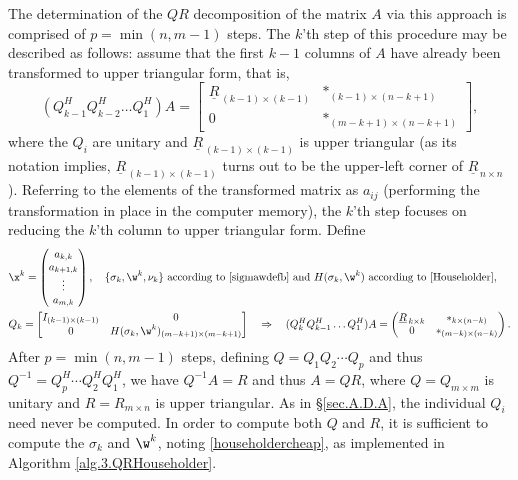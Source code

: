 The determination of the $QR$ decomposition of the matrix $A$ via this
approach is comprised of $p=\min(n,m-1)$ steps.  The $k$'th step of this
procedure may be described as follows: assume that the first $k-1$
columns of $A$ have already been transformed to upper triangular form,
that is,
\begin{equation*}
	 (Q_{k-1}^{H}Q_{k-2}^{H}\hdots Q_{1}^{H})A=\begin{bmatrix} \underline{R}_{\,(k-1)\times (k-1)} & *_{(k-1)\times (n-k+1)} \\
	 0 & *_{(m-k+1)\times (n-k+1)} \end{bmatrix},
\end{equation*}
where the $Q_{i}$ are unitary and $\underline{R}_{\,(k-1)\times (k-1)}$
is upper triangular (as its notation implies,
$\underline{R}_{\,(k-1)\times (k-1)}$ turns out to be the upper-left
corner of $\underline{R}_{\,n\times n}$).  Referring to the elements of
the transformed matrix as $a_{ij}$ (performing the transformation in
place in the computer memory), the $k$'th step focuses on reducing the
$k$'th column to upper triangular form.  Define
\begin{align*}
	 &\x^{k}=\begin{pmatrix} a_{k,k} \\ a_{k+1,k} \\ \vdots \\ a_{m,k} \end{pmatrix}, \quad
    \textrm{$\{\sigma_{k},\w^{k},\nu_{k}\}$ according to \eqref{sigmawdefb} and $H(\sigma_{k},\w^{k})$
    according to \eqref{Householder},}\\
	 &Q_{k}=\begin{bmatrix} I_{(k-1)\times (k-1)} & 0 \\
						     0 & H(\sigma_{k},\w^{k})_{(m-k+1)\times (m-k+1)} \end{bmatrix}
	 \quad \Rightarrow \quad
	 (Q_{k}^{H}Q_{k-1}^{H}\hdots Q_{1}^{H})A=\begin{pmatrix} \underline{R}_{\,k\times k} & *_{k\times (n-k)} \\
	 0 & *_{(m-k)\times (n-k)} \end{pmatrix}.
\end{align*}
After $p=\min(n,m-1)$ steps, defining $Q=Q_{1}Q_{2}\cdots Q_{p}$ and thus
$Q^{-1}=Q_{p}^{H}\cdots Q_{2}^{H}Q_{1}^{H}$, we have $Q^{-1}A=R$ and
thus $A=QR$, where $Q=Q_{m\times m}$ is unitary and $R=R_{m\times n}$
is upper triangular.  As in \S \ref{sec.A.D.A}, the individual $Q_{i}$
need never be computed.  In order to compute both $Q$ and $R$, it is
sufficient to compute the $\sigma_{k}$ and $\w^{k}$, noting
\eqref{householdercheap}, as implemented in Algorithm \ref{alg.3.QRHouseholder}.

